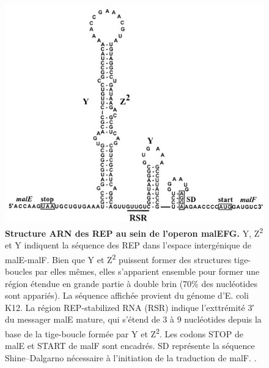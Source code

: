\documentclass[12pt,a4paper]{report}
\begin{document}
\begin{onehalfspace}
\begin{figure}[ht]
\centerline{\includegraphics[scale=0.5]{figures/fig2.png}}
\caption{\textbf{Structure ARN des REP au sein de l'operon malEFG.} Y, Z\textsuperscript{2} et Y indiquent la séquence des REP dans l'espace intergénique de malE-malF. Bien que Y et Z\textsuperscript{2} puissent former des structures tige-boucles par elles mêmes, elles s'apparient ensemble pour former une région étendue en grande partie à double brin (70\% des nucléotides sont appariés). La séquence affichée provient du génome d'E. coli K12. La région REP-stabilized RNA (RSR) indique l'exttrémité 3′ du messager malE mature, qui s'étend de 3 à 9 nucléotides depuis la base de la tige-boucle formée par Y et Z\textsuperscript{2}. Les codons STOP de  malE et START de malF sont encadrés. SD représente la séquence Shine–Dalgarno nécessaire à l'initiation de la traduction de malF. \citep{Khemici2004}.}\label{fig:fig2} 
\end{figure}



\end{onehalfspace}
\end{document}
